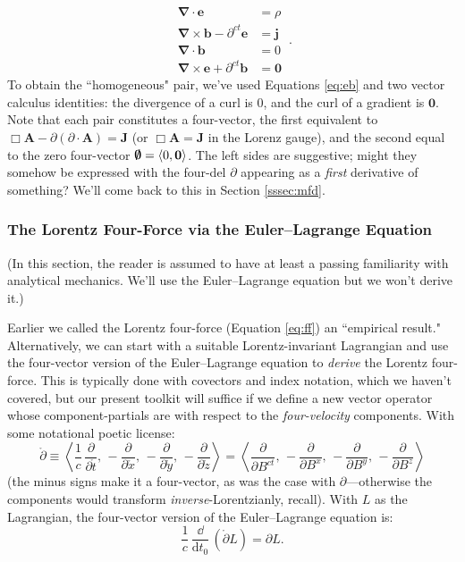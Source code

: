 \documentclass[12pt]{article}
\renewcommand{\vv}[1]{\mathbf{#1}}
\newcommand{\dd}[1]{\mathrm{d}#1}
\newcommand{\del}{\boldsymbol{\nabla}}
\begin{document}
\begin{equation}\label{eq:me}
\boxed{
\begin{aligned}
\del \cdot \vv e &= \rho \\
\del \times \vv b - \partial^{ct} \vv e &= \vv j \\ 
\del \cdot \vv b &= 0 \\
\del \times \vv e + \partial^{ct} \vv b &= \vv 0
\end{aligned}
} \, .
\end{equation}
To obtain the ``homogeneous" pair, we've used Equations \ref{eq:eb} and two vector calculus identities: the divergence of a curl is $0$, and the curl of a gradient is $\vv 0$. Note that each pair constitutes a four-vector, the first equivalent to $\Box \vv A - \partialup ( \partialup \cdot \vv A) = \vv J$ (or $\Box \vv A = \vv J$ in the Lorenz gauge), and the second equal to the zero four-vector $\textrm{\mbox{\boldmath $\emptyset$}} = \langle 0, \vv 0 \rangle$. The left sides are suggestive; might they somehow be expressed with the four-del $\partialup$ appearing as a \emph{first} derivative of something? We'll come back to this in Section \ref{sssec:mfd}.


\subsubsection{The Lorentz Four-Force via the Euler--Lagrange Equation}\label{sssec:ele}

(In this section, the reader is assumed to have at least a passing familiarity with analytical mechanics. We'll use the Euler--Lagrange equation but we won't derive it.)

Earlier we called the Lorentz four-force (Equation \ref{eq:ff}) an ``empirical result." Alternatively, we can start with a suitable Lorentz-invariant Lagrangian and use the four-vector version of the Euler--Lagrange equation to \emph{derive} the Lorentz four-force. This is typically done with covectors and index notation, which we haven't covered, but our present toolkit will suffice if we define a new vector operator whose component-partials are with respect to the \emph{four-velocity} components. With some notational poetic license:
\begin{equation*}
\mathring{\partialup} \equiv \left \langle \dfrac{1}{c} \, \dfrac{\partial}{\partial \mathring{t}} , \,  - \dfrac{\partial}{\partial \mathring{x}} , \, - \dfrac{\partial}{\partial \mathring{y}} , \, - \dfrac{\partial}{\partial \mathring{z}} \right \rangle = \left \langle \dfrac{\partial}{\partial B^{ct}} , \,  - \dfrac{\partial}{\partial B^x} , \, - \dfrac{\partial}{\partial B^y} , \, - \dfrac{\partial}{\partial B^z} \right \rangle
\end{equation*}
(the minus signs make it a four-vector, as was the case with $\partialup$---otherwise the components would transform \emph{inverse}-Lorentzianly, recall). With $L$ as the Lagrangian, the four-vector version of the Euler--Lagrange equation is:
\begin{equation}\label{eq:ele}
\dfrac{1}{c} \, \dfrac{\dd}{\dd t_0} \, ( \mathring{\partialup} L ) = \partialup L .
\end{equation}
\end{document}
